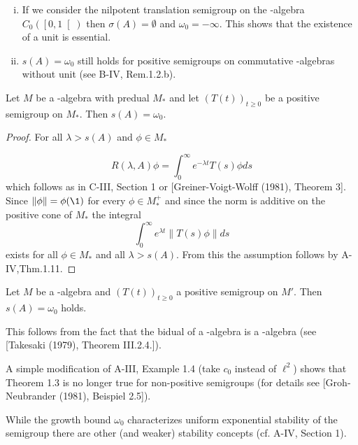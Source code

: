 \newpage

\begin{remark}\label{rem:d4-1.2}
\begin{enumerate}[(i)]
\item
If we consider the nilpotent translation semigroup on the \CA-algebra $C_{0}( \left[0,1\right[ )$ then $\sigma(A) = \emptyset$ and $\omega_{0} = -\infty$.
This shows that the existence of a unit is essential.

\item
$s(A) = \omega_{0}$ still holds for positive semigroups on commutative \CA-algebras without unit (see B-IV, Rem.1.2.b).
\end{enumerate}
\end{remark}

\begin{theorem}\label{thm:d4-1.3}
Let $M$ be a \WA-algebra with predual $M_{*}$ and let $(T(t))_{t \geq 0}$ be a positive semigroup on $M_{*}$.
Then $s(A) = \omega_{0}$.
\end{theorem}

\begin{proof}
For all $\lambda > s(A)$ and $\phi \in M_{*}$

\[
R(\lambda,A)\phi = \int_{0}^{\infty} e^{-\lambda t}T(s)\phi ds
\]
which follows as in C-III, Section 1 or [Greiner-Voigt-Wolff (1981), Theorem 3].
Since $\|\phi\| = \phi(\1)$ for every $\phi \in M_{*}^{+}$ and since the norm is additive on the positive cone of $M_{*}$ the integral
\[
	\int_{0}^{\infty} e^{\lambda t}\|T(s)\phi\|ds
\]
exists for all $\phi \in M_{*}$ and all $\lambda > s(A)$.
From this the assumption follows by A-IV,Thm.1.11.
\end{proof}
\begin{corollary}\label{cor:d4-1.4}
Let $M$ be a \CA-algebra and $(T(t))_{t \geq 0}$ a positive semigroup on $M'$.
Then $s(A) = \omega_{0}$ holds.
\end{corollary}
This follows from the fact that the bidual of a \CA-algebra is a \WA-algebra (see [Takesaki (1979), Theorem III.2.4.]).
\begin{remark}\label{rem:d4-1.5}
A simple modification of A-III, Example 1.4 (take $c_{0}$ instead of $\ell^2$) shows that Theorem 1.3 is no longer true for non-positive semigroups (for details see [Groh-Neubrander (1981), Beispiel 2.5]).

While the growth bound $\omega_{0}$ characterizes uniform exponential stability of the semigroup there are other (and weaker) stability concepts (cf. A-IV, Section 1).
\end{remark}

